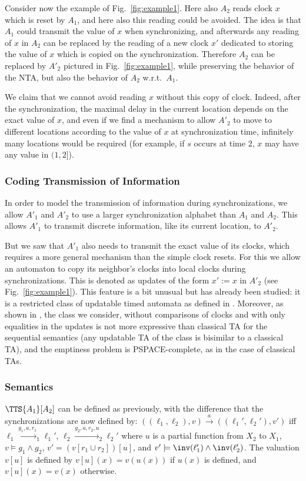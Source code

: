 \documentclass{LMCS}
\theoremstyle{plain}\newtheorem*{prop11}{Proposition~\ref{prop:states} bis}
\begin{document}
Consider now the example of Fig.~\ref{fig:example1}. Here also $A_2$ reads clock
$x$ which is reset by $A_1$, and here also this reading could be avoided.
The idea is that $A_1$ could transmit the value of $x$ when
synchronizing, and afterwards any reading of $x$ in $A_2$ can be replaced
by the reading of a new clock $x'$ dedicated to storing the value of $x$
which is copied on the synchronization. Therefore $A_2$ can be replaced by
$A'_2$ pictured in Fig.~\ref{fig:example1}, while preserving the behavior of
the NTA, but also the behavior of $A_2$ w.r.t.\ $A_1$.

We claim that we cannot avoid reading $x$ without this copy of clock. Indeed,
after the synchronization, the maximal delay in the current location depends on
the exact value of $x$, and even if we find a mechanism to allow $A'_2$ to
move to different locations according to the value of $x$ at synchronization
time, infinitely many locations would be required (for example, if $s$ occurs
at time 2, $x$ may have any value in $(1,2]$).

\subsubsection*{Coding Transmission of Information}
In order to model the transmission of information during synchronizations, we
allow $A'_1$ and $A'_2$ to use a larger synchronization alphabet than
$A_1$ and $A_2$. This allows $A'_1$ to transmit discrete information,
like its current location, to $A'_2$.

But we saw that $A'_1$ also needs to transmit the exact value of its clocks,
which requires a more general mechanism than the simple clock resets.
For this we allow an automaton to copy its neighbor's clocks into local clocks
during synchronizations. This is denoted as updates of the form $x':=x$ in
$A'_2$ (see Fig.~\ref{fig:example1}).
This feature is a bit unusual but has already been studied: it is a restricted
class of updatable timed automata as defined in \cite{upd}.
Moreover, as shown in \cite{upd}, the class we consider, without comparisons of
clocks and with only equalities in the updates
is not more expressive than classical TA for the sequential semantics
(any updatable TA of the class is bisimilar to a classical TA), and the
emptiness problem is \textsf{PSPACE}-complete, as in the case of classical TAs.

\subsubsection*{Semantics}
$\TTS{A_1}[A_2]$ can be defined as previously,
with the difference that the synchronizations are now defined by:
$((\ell_1,\ell_2),v)\xrightarrow{a}((\ell_1',\ell_2'),v')$
iff $\ell_1\xrightarrow{g_1,a,r_1}_1\ell_1'$,
$\ell_2\xrightarrow{g_2,a,r_2,u}_2\ell_2'$ where $u$ is a partial function
from $X_2$ to $X_1$, \mbox{$v\models g_1\land g_2$},
\mbox{$v'=(v[r_1\cup r_2])[u]$},
and $v'\models\inv(\ell_1')\land\inv(\ell_2')$. The valuation $v[u]$ is defined by
$v[u](x)=v(u(x))$ if $u(x)$ is defined, and $v[u](x)=v(x)$ otherwise.
\end{document}
